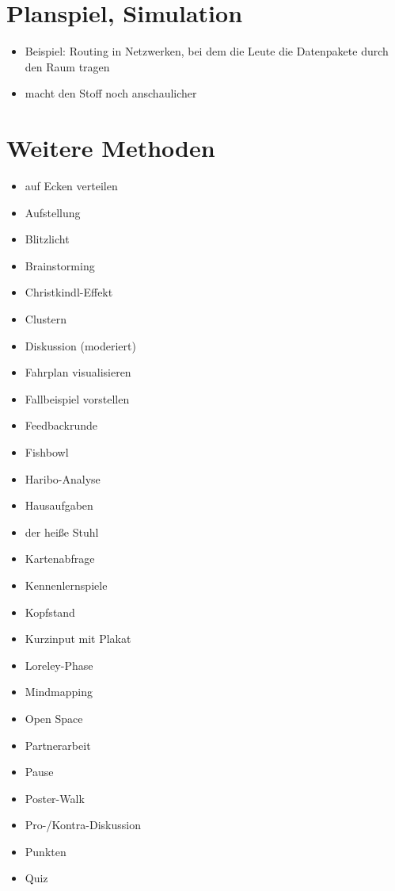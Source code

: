 \section{Planspiel, Simulation}
\begin{itemize}
    \item Beispiel: Routing in Netzwerken, bei dem die Leute die Datenpakete durch den Raum tragen
    \item macht den Stoff noch anschaulicher
\end{itemize}


\section{Weitere Methoden}

\twocolumn
\begin{itemize}
    \item auf Ecken verteilen
    \item Aufstellung
    \item Blitzlicht
    \item Brainstorming
    \item Christkindl-Effekt
    \item Clustern
    \item Diskussion (moderiert)
    \item Fahrplan visualisieren
    \item Fallbeispiel vorstellen
    \item Feedbackrunde
    \item Fishbowl
    \item Haribo-Analyse
    \item Hausaufgaben
    \item der heiße Stuhl
    \item Kartenabfrage
    \item Kennenlernspiele
    \item Kopfstand
    \item Kurzinput mit Plakat
    \item Loreley-Phase
    \item Mindmapping
    \item Open Space
    \item Partnerarbeit
    \item Pause
    \item Poster-Walk
    \item Pro-/Kontra-Diskussion
    \item Punkten
    \item Quiz

\end{itemize}
